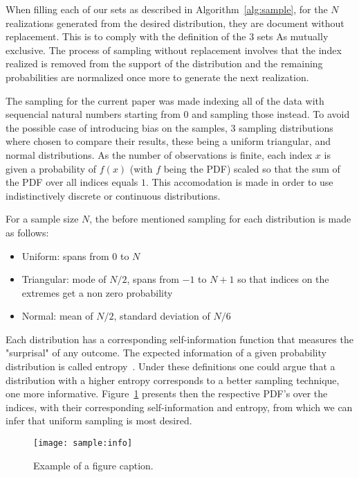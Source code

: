 \documentclass[journal]{IEEEtran}
\begin{document}
When filling each of our sets as described in Algorithm~\ref{alg:sample}, for
the $N$ realizations generated from the desired distribution, they are document
without replacement. This is to comply with the definition of the $3$ sets As
mutually exclusive. The process of sampling without replacement involves that
the index realized is removed from the support of the distribution and the
remaining probabilities are normalized once more to generate the next
realization.

The sampling for the current paper was made indexing all of the data with
sequencial natural numbers starting from $0$ and sampling those instead. To
avoid the possible case of introducing bias on the samples, $3$ sampling
distributions where chosen to compare their results, these being a uniform
triangular, and normal distributions. As the number of observations is finite,
each index $x$ is given a probability of $f(x)$ (with $f$ being the PDF) scaled
so that the sum of the PDF over all indices equals $1$. This accomodation is
made in order to use indistinctively discrete or continuous distributions.

For a sample size $N$, the before mentioned sampling for each distribution is
made as follows:
\begin{itemize}
    \item Uniform: spans from $0$ to $N$
    \item Triangular: mode of $N/2$, spans from $-1$ to $N+1$ so that indices on
        the extremes get a non zero probability
    \item Normal: mean of $N/2$, standard deviation of $N/6$
\end{itemize}

Each distribution has a corresponding self-information function that measures
the "surprisal" of any outcome. The expected information of a given probability
distribution is called entropy~\cite{information:borda}. Under these definitions
one could argue that a distribution with a higher entropy corresponds to a
better sampling technique, one more informative. Figure~\ref{fig:sample:info}
presents then the respective PDF's over the indices, with their corresponding
self-information and entropy, from which we can infer that uniform sampling is
most desired.


\begin{figure}[ht]
    \texttt{[image: sample:info]}
    \caption{Example of a figure caption. \label{fig:sample:info}}
\end{figure}
\end{document}
